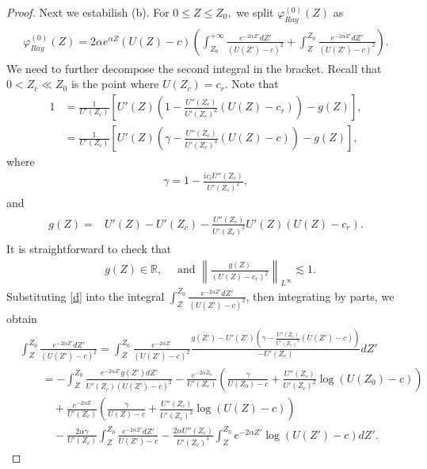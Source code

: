 \documentclass[reqno,11pt]{amsart}
\numberwithin{equation}{section}
\numberwithin{equation}{section}
\theoremstyle{plain}
\begin{document}
\begin{proof}
	Next we estabilish (b). For $0\leq Z\leq Z_0,$ we split $\varphi^{(0)}_{Ray}(Z)$ as
	\begin{align}\label{phi0-small}\begin{aligned}
			\varphi_{Ray}^{(0)}(Z)=2\alpha e^{\alpha Z}(U(Z)-c)\left(\int_{Z_0}^{+\infty}\frac{e^{-2\alpha Z'}dZ'}{(U(Z')-c)^2}+\int_{Z}^{Z_0}\frac{e^{-2\alpha Z'}dZ'}{(U(Z')-c)^2}\right).
	\end{aligned}\end{align}
	We need to further decompose the second integral in the bracket. Recall that $0<Z_c\ll Z_0$ is the point where $U(Z_c)=c_r$. Note that
	\begin{align}
	1&=\frac{1}{U'(Z_c)}\left[U'(Z)\left(1-\frac{U''(Z_c)}{U'(Z_c)^2}(U(Z)-c_r)\right)-g(Z)\right],\nonumber\\
	&=\frac{1}{U'(Z_c)}\left[U'(Z)\left(\gamma-\frac{U''(Z_c)}{U'(Z_c)^2}(U(Z)-c)\right)-g(Z)\right],
	\label{d}
	\end{align}
where
\begin{align}
	\gamma= 1-\frac{ic_iU''(Z_c)}{U'(Z_c)^2},\label{gamma}
\end{align}
and
	\begin{align}\label{def-g}\begin{aligned}
			g(Z)=&U'(Z)-U'(Z_c)-\frac{U''(Z_c)}{U'(Z_c)^2}U'(Z)(U(Z)-c_r).
	\end{aligned}\end{align}
	It is straightforward to check that 
	\begin{align}\label{bound-g}
		&g(Z)\in\mathbb{R},\quad\text{ and } \left\|\frac{g(Z)}{(U(Z)-c_r)^2}\right\|_{L^\infty}\lesssim 1. 
	\end{align}
Substituting \eqref{d} into the integral $\int_{Z}^{Z_0}\frac{e^{-2\alpha Z'}dZ'}{(U(Z')-c)^2}$, then integrating by parts, we obtain 
	\begin{align*}
			&\int_{Z}^{Z_0}\frac{e^{-2\alpha Z'}dZ'}{(U(Z')-c)^2}
			=\int_{Z}^{Z_0}\frac{e^{-2\alpha Z'}}{(U(Z')-c)^2}\frac{g(Z')-U'(Z')\left(\gamma-\frac{U''(Z_c)}{U'(Z_c)^2}(U(Z')-c)\right)}{-U'(Z_c)}dZ'\\
			&\qquad=-\int_{Z}^{Z_0}\frac{e^{-2\alpha Z'}g(Z')dZ'}{U'(Z_c)(U(Z')-c)^2}-\frac{e^{-2\alpha Z_0}}{U'(Z_c)}\left(\frac{\gamma}{U(Z_0)-c}+\frac{U''(Z_c)}{U'(Z_c)^2}\log(U(Z_0)-c)\right) \\
			&\qquad\quad+\frac{e^{-2\alpha Z}}{U'(Z_c)}\left(\frac{\gamma}{U(Z)-c}+\frac{U''(Z_c)}{U'(Z_c)^2}\log(U(Z)-c)\right)\\
			&\qquad\quad-\frac{2\alpha\gamma}{U'(Z_c)}\int_{Z}^{Z_0}\frac{e^{-2\alpha Z'}dZ'}{U(Z')-c}-\frac{2\alpha U''(Z_c)}{U'(Z_c)^3}\int_{Z}^{Z_0}e^{-2\alpha Z'}\log(U(Z')-c)dZ'.

\end{align*}
\end{proof}
\end{document}
